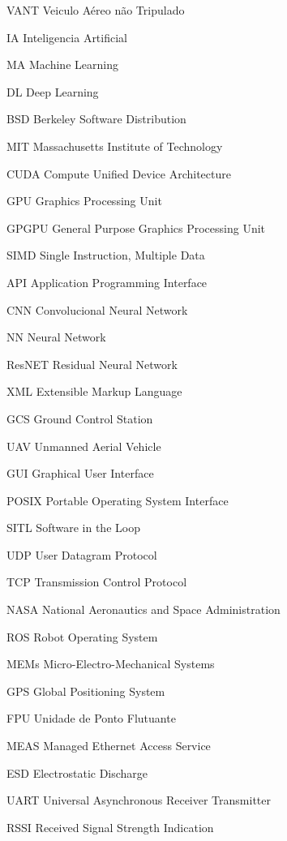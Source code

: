 \documentclass[
	12pt,					%
	openright,				%
	oneside,					%
	a4paper,					%
	english,					%
	brazil					%
	]{abntex2}
\begin{document}
\begin{siglas}
  \item [VANT] Veiculo Aéreo não Tripulado
  \item [IA] Inteligencia Artificial
  \item [MA] Machine Learning
  \item [DL] Deep Learning
  \item [BSD] Berkeley Software Distribution
  \item [MIT] Massachusetts Institute of Technology
  \item [CUDA] Compute Unified Device Architecture
  \item [GPU] Graphics Processing Unit
  \item [GPGPU] General Purpose Graphics Processing Unit
  \item [SIMD] Single Instruction, Multiple Data
  \item [API] Application Programming Interface
  \item [CNN] Convolucional Neural Network
  \item [NN] Neural Network
  \item [ResNET] Residual Neural Network
  \item [XML] Extensible Markup Language
  \item [GCS] Ground Control Station
  \item [UAV] Unmanned Aerial Vehicle
  \item [GUI] Graphical User Interface
  \item [POSIX] Portable Operating System Interface
  \item [SITL] Software in the Loop
  \item [UDP] User Datagram Protocol
  \item [TCP] Transmission Control Protocol
  \item [NASA] National Aeronautics and Space Administration
  \item [ROS] Robot Operating System
  \item [MEMs] Micro-Electro-Mechanical Systems
  \item [GPS] Global Positioning System
  \item [FPU] Unidade de Ponto Flutuante
  \item [MEAS] Managed Ethernet Access Service
  \item [ESD] Electrostatic Discharge
  \item [UART] Universal Asynchronous Receiver Transmitter
  \item [RSSI] Received Signal Strength Indication

\end{siglas}
\end{document}
